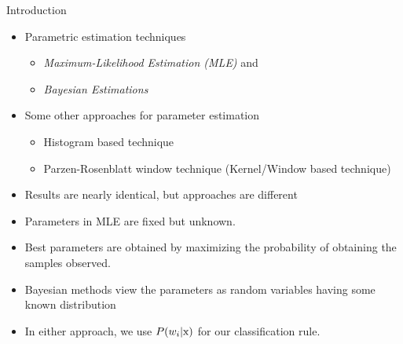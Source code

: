 \begin{frame}{Introduction}
\begin{itemize}
\item Parametric estimation techniques
\begin{itemize}
\item \textit{\color{mycolor1}Maximum-Likelihood Estimation (MLE)} and 
\item \textit{\color{mycolor2}Bayesian Estimations}
\end{itemize}
\item Some other approaches for parameter estimation
\begin{itemize}
\item Histogram based technique
\item Parzen-Rosenblatt window technique (Kernel/Window based technique)
\end{itemize}
\item Results are nearly identical, but approaches are different
\item Parameters in MLE are fixed but unknown.
\item Best parameters are obtained by maximizing the probability of obtaining the samples observed.
\item Bayesian methods view the parameters as random variables having some known distribution
\item In either approach, we use $P(w_i |{\rm x})$ for our classification rule.
\end{itemize}
\end{frame}

